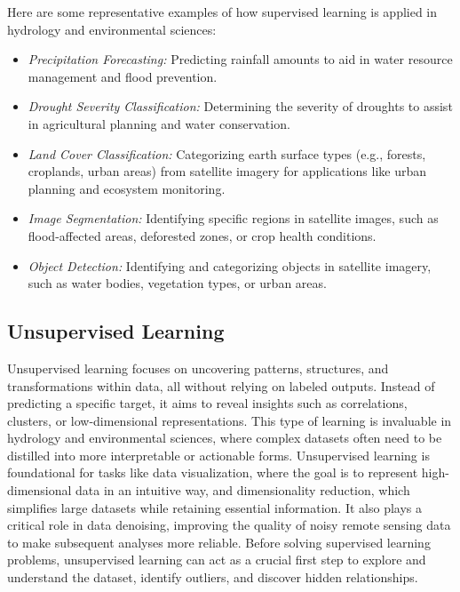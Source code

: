 Here are some representative examples of how supervised learning is applied in hydrology and environmental sciences:
\begin{itemize}
    \item \textit{Precipitation Forecasting:} Predicting rainfall amounts to aid in water resource management and flood prevention.
\item \textit{Drought Severity Classification:} Determining the severity of droughts to assist in agricultural planning and water conservation.
\item \textit{Land Cover Classification:} Categorizing earth surface types (e.g., forests, croplands, urban areas) from satellite imagery for applications like urban planning and ecosystem monitoring.
\item \textit{Image Segmentation:} Identifying specific regions in satellite images, such as flood-affected areas, deforested zones, or crop health conditions.
\item \textit{Object Detection:} Identifying and categorizing objects in satellite imagery, such as water bodies, vegetation types, or urban areas.
\end{itemize}


\subsection{Unsupervised Learning }

Unsupervised learning focuses on uncovering patterns, structures, and transformations within data, all without relying on labeled outputs. Instead of predicting a specific target, it aims to reveal insights such as correlations, clusters, or low-dimensional representations. This type of learning is invaluable in hydrology and environmental sciences, where complex datasets often need to be distilled into more interpretable or actionable forms. 
Unsupervised learning is foundational for tasks like data visualization, where the goal is to represent high-dimensional data in an intuitive way, and dimensionality reduction, which simplifies large datasets while retaining essential information. It also plays a critical role in data denoising, improving the quality of noisy remote sensing data to make subsequent analyses more reliable. Before solving supervised learning problems, unsupervised learning can act as a crucial first step to explore and understand the dataset, identify outliers, and discover hidden relationships.

